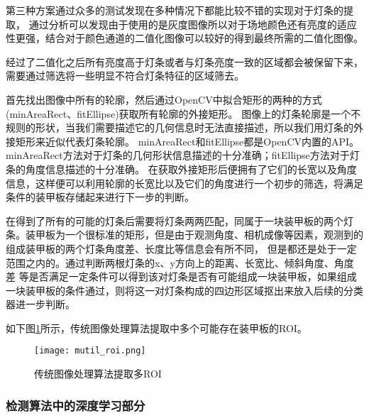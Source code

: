 第三种方案通过众多的测试发现在多种情况下都能比较不错的实现对于灯条的提取，
通过分析可以发现由于使用的是灰度图像所以对于场地颜色还有亮度的适应性更强，结合对于颜色通道的二值化图像可以较好的得到最终所需的二值化图像。\par

经过了二值化之后所有亮度高于灯条或者与灯条亮度一致的区域都会被保留下来，需要通过筛选将一些明显不符合灯条特征的区域筛去。\par

首先找出图像中所有的轮廓，然后通过OpenCV中拟合矩形的两种的方式(minAreaRect、fitEllipse)获取所有轮廓的外接矩形。
图像上的灯条轮廓是一个不规则的形状，当我们需要描述它的几何信息时无法直接描述，所以我们用灯条的外接矩形来近似代表灯条轮廓。
minAreaRect和fitEllipse都是OpenCV内置的API。minAreaRect方法对于灯条的几何形状信息描述的十分准确；fitEllipse方法对于灯条的角度信息描述的十分准确。
在获取外接矩形后便拥有了它们的长宽以及角度信息，这样便可以利用轮廓的长宽比以及它们的角度进行一个初步的筛选，将满足条件的装甲板存储起来进行下一步的判断。\par


在得到了所有的可能的灯条后需要将灯条两两匹配，同属于一块装甲板的两个灯条。装甲板为一个很标准的矩形，但是由于观测角度、相机成像等因素，观测到的组成装甲板的两个灯条角度差、长度比等信息会有所不同，
但是都还是处于一定范围之内的。通过判断两根灯条的x、y方向上的距离、长宽比、倾斜角度、角度差
等是否满足一定条件可以得到该对灯条是否有可能组成一块装甲板，如果组成一块装甲板的条件通过，则将这一对灯条构成的四边形区域抠出来放入后续的分类器进一步判断。\par
如下图\ref{传统图像处理算法提取多ROI}所示，传统图像处理算法提取中多个可能存在装甲板的ROI。

\begin{figure}[H]
    \centering
    \texttt{[image: mutil\_roi.png]} 
    \caption{传统图像处理算法提取多ROI} 
    \label{传统图像处理算法提取多ROI}
\end{figure}

\subsubsection{检测算法中的深度学习部分}

